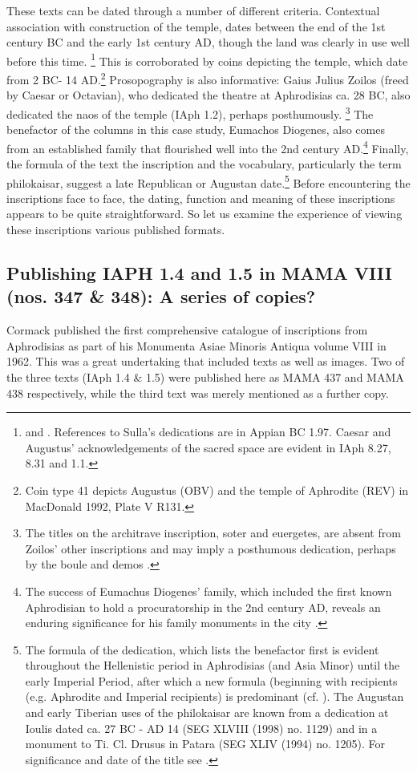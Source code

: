 \documentclass[amsthm,ebook]{saparticle}
\begin{document}
These texts can be dated through a number of different criteria. Contextual association with construction of the
temple, dates between the end of the 1st century BC and the early 1st century AD, though the land was clearly in use
well before this time. \footnote{\citet[41-42]{smith1996} and \citet[37]{reynolds1990}. References to Sulla’s dedications are in
Appian BC 1.97. Caesar and Augustus’ acknowledgements of the sacred space are evident in IAph 8.27, 8.31 and 1.1. }
This is corroborated by coins depicting the temple, which date from 2 BC- 14 AD.\footnote{ Coin type 41 depicts
Augustus (OBV) and the temple of Aphrodite (REV) in MacDonald 1992, Plate V R131. } Prosopography is also informative:
Gaius Julius Zoilos (freed by Caesar or Octavian), who dedicated the theatre at Aphrodisias ca. 28 BC, also dedicated
the naos of the temple (IAph 1.2), perhaps posthumously. \footnote{ The titles on the architrave inscription, soter and
euergetes, are absent from Zoilos’ other inscriptions and may imply a posthumous dedication, perhaps by the boule and
demos \citep[38]{reynolds1990}.} The benefactor of the columns in this case study, Eumachos Diogenes, also comes from an
established family that flourished well into the 2nd century AD.\footnote{The success of Eumachus Diogenes’ family,
which included the first known Aphrodisian to hold a procuratorship in the 2nd century AD, reveals an enduring
significance for his family monuments in the city \citep[327-334]{reynolds1999}.} Finally, the formula of the text the
inscription and the vocabulary, particularly the term philokaisar, suggest a late Republican or Augustan
date.\footnote{ The formula of the dedication, which lists the benefactor first is evident throughout the Hellenistic
period in Aphrodisias (and Asia Minor) until the early Imperial Period, after which a new formula (beginning with
recipients (e.g. Aphrodite and Imperial recipients) is predominant (cf. \citet[4-7]{graham2013}). The Augustan and early
Tiberian uses of the philokaisar are known from a dedication at Ioulis dated ca. 27 BC - AD 14 (SEG XLVIII (1998) no.
1129) and in a monument to Ti. Cl. Drusus in Patara (SEG XLIV (1994) no. 1205). For significance and date of the title
see \citet[101-105]{buraselis2000}.} Before encountering the inscriptions face to face, the dating, function and meaning of
these inscriptions appears to be quite straightforward. So let us examine the experience of viewing these
inscriptions various published formats.




\subsection{Publishing IAPH 1.4 and 1.5 in MAMA VIII (nos. 347 \& 348): A series of copies?}
\noindent Cormack published the first comprehensive catalogue of inscriptions from Aphrodisias as part of his Monumenta Asiae
Minoris Antiqua volume VIII in 1962. This was a great undertaking that included texts as well as images. Two of the
three texts (IAph 1.4 \& 1.5) were published here as MAMA 437 and MAMA 438 respectively, while the third text was
merely mentioned as a further copy. 
\end{document}
